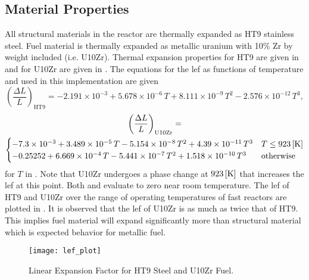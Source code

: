   \subsection{Material Properties}
    \label{sec:model_details__material_properties}
    All structural materials in the reactor are thermally expanded as HT9 
    stainless steel.
    Fuel material is thermally expanded as metallic uranium with 10\% Zr by 
    weight included (i.e. U10Zr). Thermal expansion properties for HT9 are given 
    in \cite{ht9Prop} and for U10Zr are given in \cite{thexpU10Zr}. The 
    equations for the \gls{lef} as functions of temperature and used in this 
    implementation are given
    \begin{equation}
      \label{eq:lef_ht9}
      \left( \frac{\Delta L}{L} \right)_{\text{HT9}} = 
        -2.191 \times 10^{-3} + 5.678 \times 10^{-6} \, T + 
        8.111 \times 10^{-9} \, T^2 - 2.576 \times 10^{-12} \, T^3 ,
    \end{equation}
    \begin{multline}
      \label{eq:lef_u10zr}
      \left( \frac{\Delta L}{L} \right)_{\text{U10Zr}} = \\
        \begin{cases}
          -7.3 \times 10^{-3} + 3.489 \times 10^{-5} \, T 
            - 5.154 \times 10^{-8} \, T^2 + 4.39 \times 10^{-11} \, T^3 & 
            T \le 923 \left[\text{{K}}\right] \\
          -0.25252 + 6.669 \times 10^{-4} \, T - 5.441 \times 10^{-7} \, T^2 
            + 1.518 \times 10^{-10} \, T^3 & \text{otherwise}
        \end{cases}
    \end{multline}
    for $T$ in . Note that U10Zr undergoes a phase change at 
    $923 \left[\text{{K}}\right]$ that increases the \gls{lef} at this point. Both 
     and  evaluate to zero near room
    temperature. The \gls{lef} of HT9 and U10Zr over the range of operating 
    temperatures of fast reactors are plotted in . It is
    observed that the \gls{lef} of U10Zr is as much as twice that of HT9. This 
    implies fuel material will expand significantly more than structural 
    material which is expected behavior for metallic fuel.

    \begin{figure}
      \centering
      \texttt{[image: lef\_plot]}
      \caption{Linear Expansion Factor for HT9 Steel and U10Zr Fuel.}
      \label{fig:lef_plot}
    \end{figure}
    
